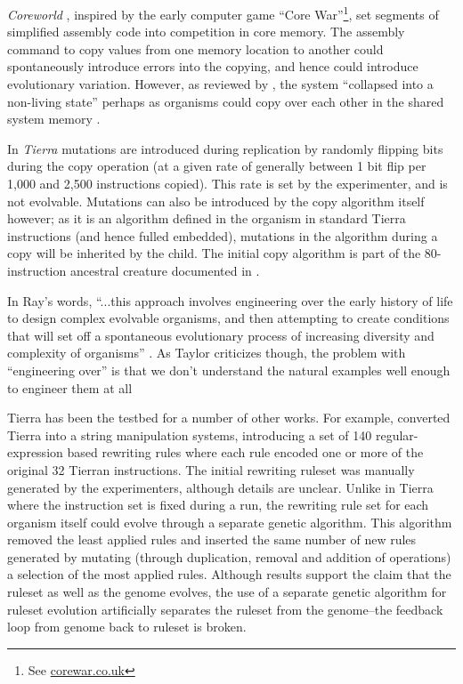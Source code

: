 \emph{Coreworld} \parencite{Rasmussen1990}, inspired by the early computer game ``Core War''\footnote{See \url{corewar.co.uk}}, set segments of simplified assembly code into competition in core memory. The assembly command to copy values from one memory location to another could spontaneously introduce errors into the copying, and hence could introduce evolutionary variation. However, as reviewed by \cite{Ofria2004}, the system ``collapsed into a non-living state'' perhaps as organisms could copy over each other in the shared system memory \parencite{Ofria2004}.

In \emph{Tierra} \parencite{Ray1991} mutations are introduced during replication by randomly flipping bits during the copy operation (at a given rate of generally between 1 bit flip per 1,000 and 2,500 instructions copied). This rate is set by the experimenter, and is not evolvable. Mutations can also be introduced by the copy algorithm itself however; as it is an algorithm defined in the organism in standard Tierra instructions (and hence fulled embedded), mutations in the algorithm during a copy will be inherited by the child. The initial copy algorithm is part of the 80-instruction ancestral creature documented in \cite[app.C]{Ray1991}.

In Ray's words, ``...this approach involves engineering over the early history of life to design complex evolvable organisms, and then attempting to create conditions that will set off a spontaneous evolutionary process of increasing diversity and complexity of organisms'' \parencite[p.3]{Ray1991}. As Taylor criticizes though, the problem with ``engineering over'' is that we don't understand the natural examples well enough to engineer them at all \parencite{Taylor2001}

Tierra has been the testbed for a number of other works. For example, \cite{SugiuraSuzukiShioseEtAl2003} converted Tierra into a string manipulation systems, introducing a set of 140 regular-expression based rewriting rules where each rule encoded one or more of the original 32 Tierran instructions. The initial rewriting ruleset was manually generated by the experimenters, although details are unclear. Unlike in Tierra where the instruction set is fixed during a run, the rewriting rule set for each organism itself could evolve through a separate genetic algorithm. This algorithm removed the least applied rules and inserted the same number of new rules generated by mutating (through duplication, removal and addition of operations) a selection of the most applied rules. Although results support the claim that the ruleset as well as the genome evolves, the use of a separate genetic algorithm for ruleset evolution artificially separates the ruleset from the genome--the feedback loop from genome back to ruleset is broken.

